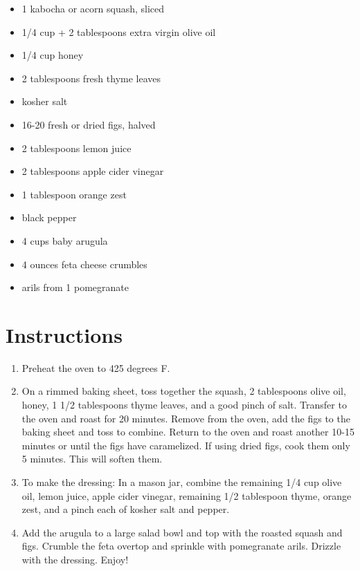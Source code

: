 \documentclass[
  letterpaper,
  DIV=11,
  numbers=noendperiod,
  titlepage=false]{scrreprt}
\providecommand{\tightlist}{%
  \setlength{\itemsep}{0pt}\setlength{\parskip}{0pt}}\usepackage{longtable,booktabs,array}
\begin{document}
\begin{itemize}
\tightlist
\item
  1 kabocha or acorn squash, sliced
\item
  1/4 cup + 2 tablespoons extra virgin olive oil
\item
  1/4 cup honey
\item
  2 tablespoons fresh thyme leaves
\item
  kosher salt
\item
  16-20 fresh or dried figs, halved
\item
  2 tablespoons lemon juice
\item
  2 tablespoons apple cider vinegar
\item
  1 tablespoon orange zest
\item
  black pepper
\item
  4 cups baby arugula
\item
  4 ounces feta cheese crumbles
\item
  arils from 1 pomegranate
\end{itemize}

\section{Instructions}\label{instructions-55}

\begin{enumerate}
\def\labelenumi{\arabic{enumi}.}
\tightlist
\item
  Preheat the oven to 425 degrees F.
\item
  On a rimmed baking sheet, toss together the squash, 2 tablespoons
  olive oil, honey, 1 1/2 tablespoons thyme leaves, and a good pinch of
  salt. Transfer to the oven and roast for 20 minutes. Remove from the
  oven, add the figs to the baking sheet and toss to combine. Return to
  the oven and roast another 10-15 minutes or until the figs have
  caramelized. If using dried figs, cook them only 5 minutes. This will
  soften them.
\item
  To make the dressing: In a mason jar, combine the remaining 1/4 cup
  olive oil, lemon juice, apple cider vinegar, remaining 1/2 tablespoon
  thyme, orange zest, and a pinch each of kosher salt and pepper.
\item
  Add the arugula to a large salad bowl and top with the roasted squash
  and figs. Crumble the feta overtop and sprinkle with pomegranate
  arils. Drizzle with the dressing. Enjoy!
\end{enumerate}
\end{document}
